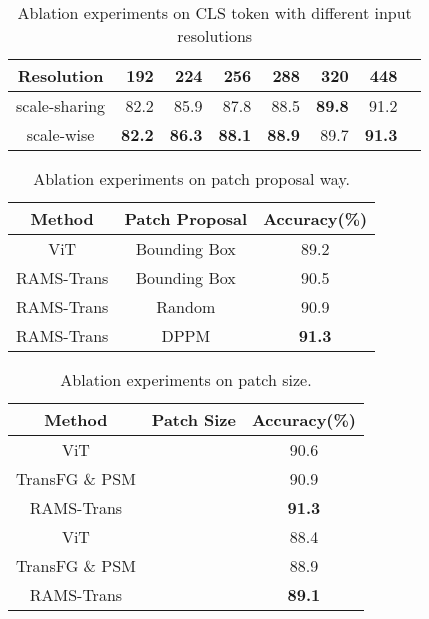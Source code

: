 \documentclass[sigconf]{acmart}
\begin{document}
\begin{table}
\caption{Ablation experiments on CLS token with different input resolutions}
\begin{center}
\begin{tabular}{c|rrrrrrr}
\hline
Resolution & 192 & 224 & 256
&288 & 320 &448\\
\hline\hline
scale-sharing & 82.2 & 85.9 & 87.8 & 88.5 & \textbf{89.8} &91.2\\
scale-wise & \textbf{82.2} & \textbf{86.3} & \textbf{88.1} & \textbf{88.9} & 89.7 &\textbf{91.3}\\
\hline
\end{tabular}
\end{center}
\label{tab_ablation}
\end{table}

\begin{table}
\caption{Ablation experiments on patch proposal way.}
\begin{center}
\begin{tabular}{c|cc}
\hline
Method & Patch Proposal & Accuracy(\%) \\
\hline\hline
ViT \cite{ViT} & Bounding Box  & 89.2 \\
RAMS-Trans & Bounding Box  & 90.5 \\
RAMS-Trans & Random & 90.9 \\
RAMS-Trans & DPPM  & \textbf{91.3} \\
\hline
\end{tabular}
\end{center}
\label{tab_ablation}
\end{table}

\begin{table}
\caption{Ablation experiments on patch size.}
\begin{center}
\begin{tabular}{c|cc}
\hline
Method & Patch Size & Accuracy(\%) \\
\hline\hline
ViT \cite{ViT} &  & 90.6 \\
TransFG \& PSM \cite{TransFG} &  & 90.9 \\
RAMS-Trans &  & \textbf{91.3} \\
\hline
ViT &   &  88.4\\
TransFG \& PSM \cite{TransFG} &   &  88.9\\
RAMS-Trans &   & \textbf{89.1} \\
\hline
\end{tabular}
\end{center}
\label{tab_ablation}
\end{table}
\end{document}
